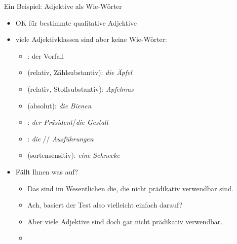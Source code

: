 \begin{frame}
  {Ein Beispiel: Adjektive als Wie-Wörter}
  \begin{itemize}[<+->]
    \item OK für bestimmte \alert{qualitative Adjektive}
      \Halbzeile
    \item viele Adjektivklassen sind aber keine Wie-Wörter:
      \begin{itemize}[<+->]
        \item {}: der  Vorfall
        \item {} (relativ, Zählsubstantiv): \textit{die  Äpfel}
        \item {} (relativ, Stoffsubstantiv): \textit{ Apfelmus}
        \item {} (absolut): \textit{die  Bienen}
        \item {}: \textit{der  Präsident}\slash\textit{die  Gestalt}
        \item {}: \textit{die }/\textit{}/\textit{ Ausführungen}
        \item {} (sortensensitiv): \textit{eine  Schnecke}
      \end{itemize}
      \Halbzeile
    \item Fällt Ihnen was auf?
      \begin{itemize}[<+->]
        \item Das sind im Wesentlichen die, die nicht prädikativ verwendbar sind.
        \item Ach, basiert der Test also vielleicht einfach darauf?
        \item Aber viele Adjektive sind doch gar nicht prädikativ verwendbar.
          \Halbzeile
        \item[ ] 
      \end{itemize}
  \end{itemize}
\end{frame}

